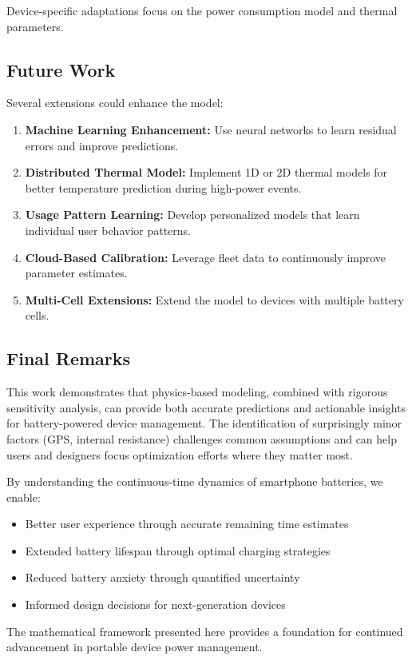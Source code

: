 Device-specific adaptations focus on the power consumption model and thermal parameters.

\subsection{Future Work}
\label{subsec:future}

Several extensions could enhance the model:

\begin{enumerate}
    \item \textbf{Machine Learning Enhancement:} Use neural networks to learn residual errors and improve predictions.
    
    \item \textbf{Distributed Thermal Model:} Implement 1D or 2D thermal models for better temperature prediction during high-power events.
    
    \item \textbf{Usage Pattern Learning:} Develop personalized models that learn individual user behavior patterns.
    
    \item \textbf{Cloud-Based Calibration:} Leverage fleet data to continuously improve parameter estimates.
    
    \item \textbf{Multi-Cell Extensions:} Extend the model to devices with multiple battery cells.
\end{enumerate}

\subsection{Final Remarks}
\label{subsec:final}

This work demonstrates that physics-based modeling, combined with rigorous sensitivity analysis, can provide both accurate predictions and actionable insights for battery-powered device management. The identification of surprisingly minor factors (GPS, internal resistance) challenges common assumptions and can help users and designers focus optimization efforts where they matter most.

By understanding the continuous-time dynamics of smartphone batteries, we enable:
\begin{itemize}
    \item Better user experience through accurate remaining time estimates
    \item Extended battery lifespan through optimal charging strategies
    \item Reduced battery anxiety through quantified uncertainty
    \item Informed design decisions for next-generation devices
\end{itemize}

The mathematical framework presented here provides a foundation for continued advancement in portable device power management.
